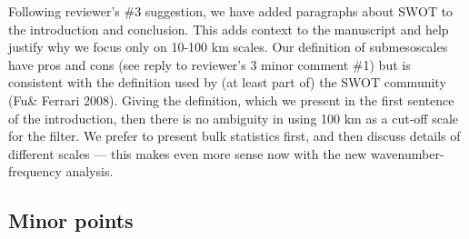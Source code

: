 \documentclass[11pt]{article}
\newcommand{\bdp}{\begin{description}}
\newcommand{\edp}{\end{description}}
\begin{document}
\begin{enumerate}
        \bdp
            Following reviewer's \#3 suggestion, we have added paragraphs about SWOT
            to the introduction and conclusion. This adds context to the manuscript
            and help justify why we focus only on 10-100 km scales. Our definition
            of submesoscales have pros and cons (see reply to reviewer's 3
            minor comment \#1) but is consistent with the definition used by
            (at least part of) the SWOT community (Fu\& Ferrari 2008). Giving the
            definition, which we present in the first sentence of the introduction,
            then there is no ambiguity in using 100 km as a cut-off scale for the filter.
            We prefer to present bulk statistics first, and then discuss details of
            different scales --- this makes even more sense now with the new wavenumber-frequency
            analysis.
        \edp

\end{enumerate}

\subsection{Minor points}
\end{document}
